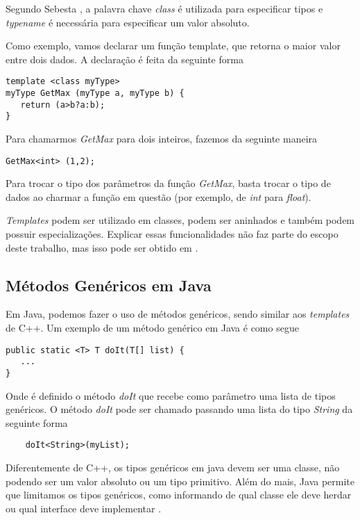 Segundo Sebesta \cite{sebesta}, a palavra chave \emph{class} é utilizada para especificar tipos e \emph{typename} é necessária para especificar um valor absoluto.

Como exemplo, vamos declarar um função template, que retorna o maior valor entre dois dados. A declaração é feita da seguinte forma
\begin{verbatim}
template <class myType>
myType GetMax (myType a, myType b) {
   return (a>b?a:b);
}
\end{verbatim}

Para chamarmos \emph{GetMax} para dois inteiros, fazemos da seguinte maneira
\begin{verbatim}
GetMax<int> (1,2);
\end{verbatim}

Para trocar o tipo dos parâmetros da função \emph{GetMax}, basta trocar o tipo de dados ao charmar a função em questão (por exemplo, de \emph{int} para \emph{float}).

\emph{Templates} podem ser utilizado em classes, podem ser aninhados e também podem possuir especializações. Explicar essas funcionalidades não faz parte do escopo deste trabalho, mas isso pode ser obtido em \cite{template_cpluplus}.

\subsection{Métodos Genéricos em Java} %
\label{sub:metodos_genericos_em_java}
Em Java, podemos fazer o uso de métodos genéricos, sendo similar aos \emph{templates} de C++. Um exemplo de um método genérico em Java é como segue
\begin{verbatim}
public static <T> T doIt(T[] list) {
   ...
}
\end{verbatim}

Onde é definido o método \emph{doIt} que recebe como parâmetro uma lista de tipos genéricos. O método \emph{doIt} pode ser chamado passando uma lista do tipo \emph{String} da seguinte forma
\begin{verbatim}
	doIt<String>(myList);
\end{verbatim}

Diferentemente de C++, os tipos genéricos em java devem ser uma classe, não podendo ser um valor absoluto ou um tipo primitivo. Além do mais, Java permite que limitamos os tipos genéricos, como informando de qual classe ele deve herdar ou qual interface deve implementar \cite{sebesta}.

